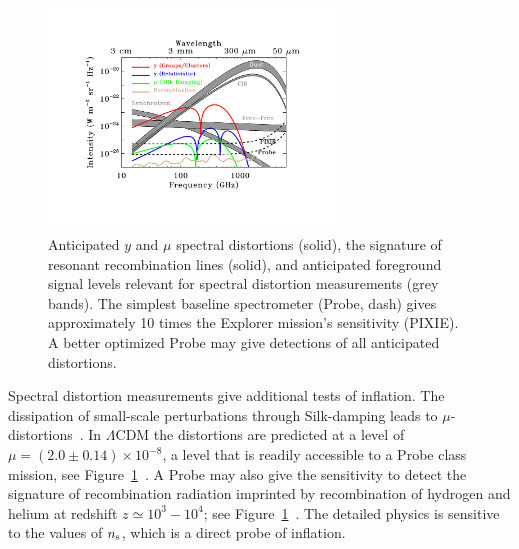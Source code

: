\begin{figure}[ht!]
\hspace{-0.2in}
\parbox{4.0in}{\centerline {
\includegraphics[width=3.0in]{Figures/probe_spectral_foregrounds_v3.pdf} } }
\hspace{-0.05in}
\parbox{2.5in}{
\caption{ \small \setlength{\baselineskip}{0.90\baselineskip}
Anticipated $y$ and $\mu$ spectral distortions (solid), the signature of resonant recombination lines (solid), and anticipated foreground 
signal levels relevant for spectral distortion measurements (grey bands). 
The simplest baseline spectrometer 
(Probe, dash) gives approximately 10 times the Explorer mission's sensitivity (PIXIE). 
A better optimized Probe may give detections of all anticipated distortions. 
\label{fig:distortions} } }
\vspace{-0.1in}
\end{figure}

Spectral distortion measurements give additional tests of inflation. The dissipation of small-scale 
perturbations through Silk-damping leads to $\mu$-distortions~\cite{Sunyaev1970diss, Daly1991, Hu1994, Chluba2012}. 
In $\Lambda$CDM the distortions are predicted at a level of $\mu=(2.0\pm0.14)\times 10^{-8}$, a level that 
is readily accessible to a Probe class mission, see Figure~\ref{fig:distortions}~\cite{Chluba2012, Chluba2016LCDM}. 
A Probe may also give the sensitivity to detect the signature of recombination 
radiation imprinted by recombination of hydrogen and helium 
at redshift $z\simeq 10^3-10^4$; see Figure~\ref{fig:distortions}~\citep{Sunyaev2009, Chluba2016}. 
The detailed physics is sensitive to the values of $n_{\rm s}$, which is a direct probe of inflation. 



